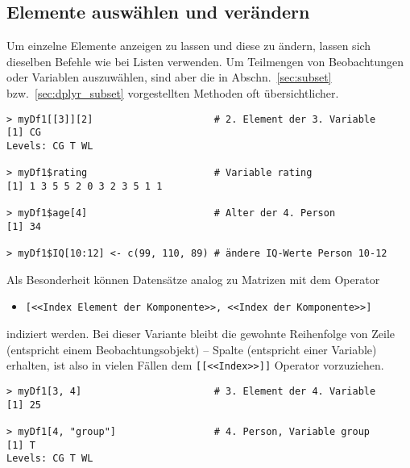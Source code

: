 \subsection{Elemente auswählen und verändern}
\label{sec:dfIndex}

Um einzelne Elemente anzeigen zu lassen und diese zu ändern, lassen sich dieselben Befehle wie bei Listen verwenden. Um Teilmengen von Beobachtungen oder Variablen auszuwählen, sind aber die in Abschn.\ \ref{sec:subset} bzw.\ \ref{sec:dplyr_subset} vorgestellten Methoden oft übersichtlicher.
\begin{lstlisting}
> myDf1[[3]][2]                     # 2. Element der 3. Variable
[1] CG
Levels: CG T WL

> myDf1$rating                      # Variable rating
[1] 1 3 5 5 2 0 3 2 3 5 1 1

> myDf1$age[4]                      # Alter der 4. Person
[1] 34

> myDf1$IQ[10:12] <- c(99, 110, 89) # ändere IQ-Werte Person 10-12
\end{lstlisting}

Als Besonderheit können Datensätze analog zu Matrizen mit dem Operator
\begin{itemize}
\item \lstinline![<<Index Element der Komponente>>, <<Index der Komponente>>]!
\end{itemize}
indiziert werden. Bei dieser Variante bleibt die gewohnte Reihenfolge von Zeile (entspricht einem Beobachtungsobjekt) -- Spalte (entspricht einer Variable) erhalten, ist also in vielen Fällen dem \lstinline![[<<Index>>]]! Operator vorzuziehen.
\begin{lstlisting}
> myDf1[3, 4]                       # 3. Element der 4. Variable
[1] 25

> myDf1[4, "group"]                 # 4. Person, Variable group
[1] T
Levels: CG T WL
\end{lstlisting}


